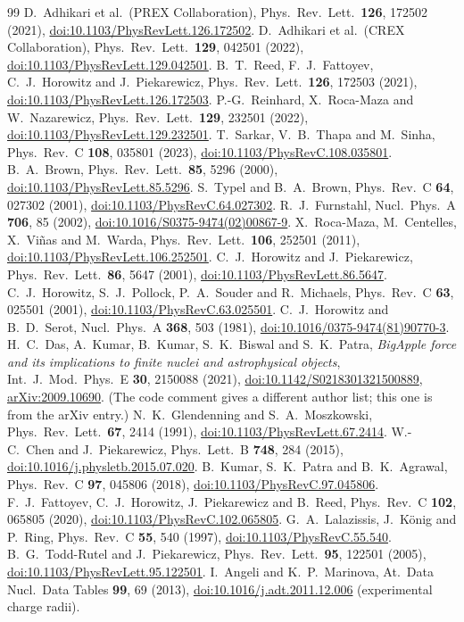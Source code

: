 \documentclass[11pt,a4paper]{article}
\newcommand{\doi}[1]{\href{https://doi.org/#1}{doi:#1}}
\newcommand{\arxiv}[1]{\href{https://arxiv.org/abs/#1}{arXiv:#1}}
\begin{document}
\begin{thebibliography}{99}
\small
{} D.~Adhikari et al.\ (PREX Collaboration), Phys.\ Rev.\ Lett.\ \textbf{126}, 172502 (2021), \doi{10.1103/PhysRevLett.126.172502}.
 D.~Adhikari et al.\ (CREX Collaboration), Phys.\ Rev.\ Lett.\ \textbf{129}, 042501 (2022), \doi{10.1103/PhysRevLett.129.042501}.
 B.~T.~Reed, F.~J.~Fattoyev, C.~J.~Horowitz and J.~Piekarewicz, Phys.\ Rev.\ Lett.\ \textbf{126}, 172503 (2021), \doi{10.1103/PhysRevLett.126.172503}.
 P.-G.~Reinhard, X.~Roca-Maza and W.~Nazarewicz, Phys.\ Rev.\ Lett.\ \textbf{129}, 232501 (2022), \doi{10.1103/PhysRevLett.129.232501}.
 T.~Sarkar, V.~B.~Thapa and M.~Sinha, Phys.\ Rev.\ C \textbf{108}, 035801 (2023), \doi{10.1103/PhysRevC.108.035801}.
 B.~A.~Brown, Phys.\ Rev.\ Lett.\ \textbf{85}, 5296 (2000), \doi{10.1103/PhysRevLett.85.5296}.
 S.~Typel and B.~A.~Brown, Phys.\ Rev.\ C \textbf{64}, 027302 (2001), \doi{10.1103/PhysRevC.64.027302}.
 R.~J.~Furnstahl, Nucl.\ Phys.\ A \textbf{706}, 85 (2002), \doi{10.1016/S0375-9474(02)00867-9}.
 X.~Roca-Maza, M.~Centelles, X.~Vi\~nas and M.~Warda, Phys.\ Rev.\ Lett.\ \textbf{106}, 252501 (2011), \doi{10.1103/PhysRevLett.106.252501}.
 C.~J.~Horowitz and J.~Piekarewicz, Phys.\ Rev.\ Lett.\ \textbf{86}, 5647 (2001), \doi{10.1103/PhysRevLett.86.5647}.
 C.~J.~Horowitz, S.~J.~Pollock, P.~A.~Souder and R.~Michaels, Phys.\ Rev.\ C \textbf{63}, 025501 (2001), \doi{10.1103/PhysRevC.63.025501}.
 C.~J.~Horowitz and B.~D.~Serot, Nucl.\ Phys.\ A \textbf{368}, 503 (1981), \doi{10.1016/0375-9474(81)90770-3}.
 H.~C.~Das, A.~Kumar, B.~Kumar, S.~K.~Biswal and S.~K.~Patra, \emph{BigApple force and its implications to finite nuclei and astrophysical objects}, Int.\ J.\ Mod.\ Phys.\ E \textbf{30}, 2150088 (2021), \doi{10.1142/S0218301321500889}, \arxiv{2009.10690}. (The code comment gives a different author list; this one is from the arXiv entry.)
 N.~K.~Glendenning and S.~A.~Moszkowski, Phys.\ Rev.\ Lett.\ \textbf{67}, 2414 (1991), \doi{10.1103/PhysRevLett.67.2414}.
 W.-C.~Chen and J.~Piekarewicz, Phys.\ Lett.\ B \textbf{748}, 284 (2015), \doi{10.1016/j.physletb.2015.07.020}.
 B.~Kumar, S.~K.~Patra and B.~K.~Agrawal, Phys.\ Rev.\ C \textbf{97}, 045806 (2018), \doi{10.1103/PhysRevC.97.045806}.
 F.~J.~Fattoyev, C.~J.~Horowitz, J.~Piekarewicz and B.~Reed, Phys.\ Rev.\ C \textbf{102}, 065805 (2020), \doi{10.1103/PhysRevC.102.065805}.
 G.~A.~Lalazissis, J.~K\"onig and P.~Ring, Phys.\ Rev.\ C \textbf{55}, 540 (1997), \doi{10.1103/PhysRevC.55.540}.
 B.~G.~Todd-Rutel and J.~Piekarewicz, Phys.\ Rev.\ Lett.\ \textbf{95}, 122501 (2005), \doi{10.1103/PhysRevLett.95.122501}.
 I.~Angeli and K.~P.~Marinova, At.\ Data Nucl.\ Data Tables \textbf{99}, 69 (2013), \doi{10.1016/j.adt.2011.12.006} (experimental charge radii).
\end{thebibliography}
\end{document}
